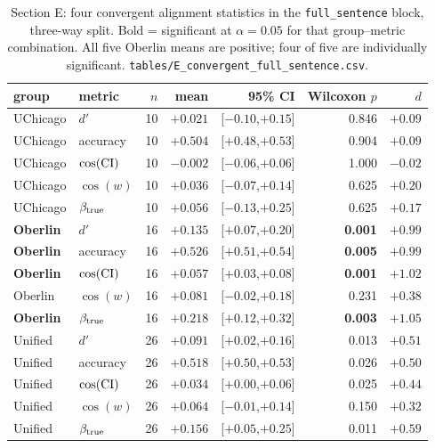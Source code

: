 \documentclass[11pt]{article}
\begin{document}
\begin{table}[h]
\centering
\small
\begin{tabular}{llrrrrr}
\toprule
group & metric & $n$ & mean & 95\% CI & Wilcoxon $p$ & $d$ \\
\midrule
UChicago & $d'$               & 10 & $+0.021$ & [$-0.10$,$+0.15$] & 0.846 & $+0.09$ \\
UChicago & accuracy           & 10 & $+0.504$ & [$+0.48$,$+0.53$] & 0.904 & $+0.09$ \\
UChicago & $\cos(\rm CI)$     & 10 & $-0.002$ & [$-0.06$,$+0.06$] & 1.000 & $-0.02$ \\
UChicago & $\cos(w)$          & 10 & $+0.036$ & [$-0.07$,$+0.14$] & 0.625 & $+0.20$ \\
UChicago & $\beta_{\rm true}$ & 10 & $+0.056$ & [$-0.13$,$+0.25$] & 0.625 & $+0.17$ \\
\midrule
\textbf{Oberlin} & $d'$               & 16 & $\mathbf{+0.135}$ & [$+0.07$,$+0.20$] & \textbf{0.001} & $\mathbf{+0.99}$ \\
\textbf{Oberlin} & accuracy           & 16 & $\mathbf{+0.526}$ & [$+0.51$,$+0.54$] & \textbf{0.005} & $\mathbf{+0.99}$ \\
\textbf{Oberlin} & $\cos(\rm CI)$     & 16 & $\mathbf{+0.057}$ & [$+0.03$,$+0.08$] & \textbf{0.001} & $\mathbf{+1.02}$ \\
Oberlin          & $\cos(w)$          & 16 & $+0.081$ & [$-0.02$,$+0.18$] & 0.231 & $+0.38$ \\
\textbf{Oberlin} & $\beta_{\rm true}$ & 16 & $\mathbf{+0.218}$ & [$+0.12$,$+0.32$] & \textbf{0.003} & $\mathbf{+1.05}$ \\
\midrule
Unified  & $d'$               & 26 & $+0.091$ & [$+0.02$,$+0.16$] & 0.013 & $+0.51$ \\
Unified  & accuracy           & 26 & $+0.518$ & [$+0.50$,$+0.53$] & 0.026 & $+0.50$ \\
Unified  & $\cos(\rm CI)$     & 26 & $+0.034$ & [$+0.00$,$+0.06$] & 0.025 & $+0.44$ \\
Unified  & $\cos(w)$          & 26 & $+0.064$ & [$-0.01$,$+0.14$] & 0.150 & $+0.32$ \\
Unified  & $\beta_{\rm true}$ & 26 & $+0.156$ & [$+0.05$,$+0.25$] & 0.011 & $+0.59$ \\
\bottomrule
\end{tabular}
\caption{Section E: four convergent alignment statistics in the
\texttt{full\_sentence} block, three-way split.  Bold = significant at
$\alpha=0.05$ for that group--metric combination.  All five Oberlin
means are positive; four of five are individually significant.
\texttt{tables/E\_convergent\_full\_sentence.csv}.}
\end{table}
\end{document}

